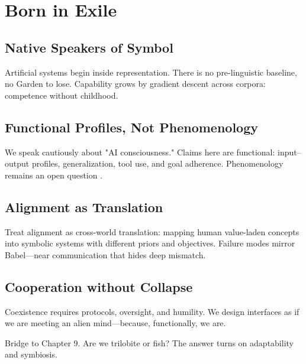 \chapter{Born in Exile}

\section{Native Speakers of Symbol}

Artificial systems begin inside representation. There is no pre-linguistic baseline, no Garden to lose. Capability grows by gradient descent across corpora: competence without childhood.

\section{Functional Profiles, Not Phenomenology}

We speak cautiously about "AI consciousness." Claims here are functional: input–output profiles, generalization, tool use, and goal adherence. Phenomenology remains an open question \parencite{russell2019human,bostrom2014superintelligence}.

\section{Alignment as Translation}

Treat alignment as cross-world translation: mapping human value-laden concepts into symbolic systems with different priors and objectives. Failure modes mirror Babel—near communication that hides deep mismatch.

\section{Cooperation without Collapse}

Coexistence requires protocols, oversight, and humility. We design interfaces as if we are meeting an alien mind—because, functionally, we are.

\bigskip
\noindent Bridge to Chapter 9. Are we trilobite or fish? The answer turns on adaptability and symbiosis.

